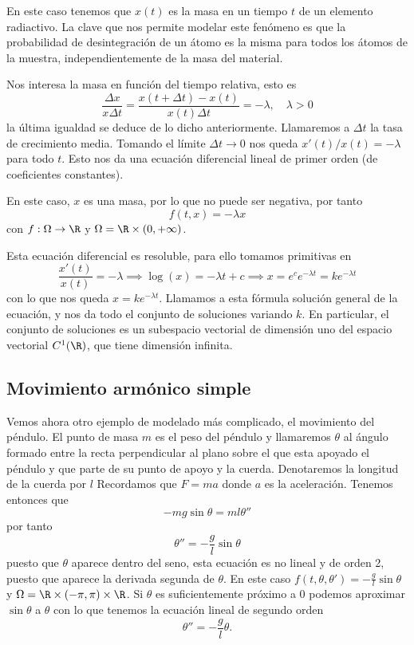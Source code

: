 \documentclass[../main.tex]{subfiles}
\begin{document}
En este caso tenemos que \(x(t)\) es
la masa en un tiempo \(t\) de un elemento radiactivo. La clave que nos permite
modelar este fenómeno es que la probabilidad de desintegración de un átomo es la
misma para todos los átomos de la muestra, independientemente de la masa del
material.

Nos interesa la masa en función del tiempo relativa, esto es
\[\frac{\Delta x}{x \Delta t} = \frac{x(t + \Delta t) - x(t)}{x(t) \Delta t}
	= -\lambda, \quad \lambda > 0\]
la última igualdad se deduce de lo dicho anteriormente. Llamaremos a
\(\Delta t\) la tasa de crecimiento media. Tomando el límite \(\Delta t \to 0\)
nos queda \(x'(t)/x(t) = -\lambda\) para todo \(t\). Esto nos da una ecuación
diferencial lineal de primer orden (de coeficientes constantes).

En este caso, \(x\) es una masa, por lo que no puede ser negativa, por tanto
\[f(t, x) = -\lambda x\]
con \(f : \Omega \to \R\) y \(\Omega = \R \times (0, +\infty)\).

Esta ecuación diferencial es resoluble, para ello tomamos primitivas en
\[\frac{x'(t)}{x(t)} = -\lambda \implies \log(x) = -\lambda t + c
	\implies x = e^c e^{-\lambda t} = k e^{-\lambda t}\]
con lo que nos queda \(x = k e^{-\lambda t}\). Llamamos a esta fórmula solución
general de la ecuación, y nos da todo el conjunto de soluciones variando
\(k\). En particular, el conjunto de soluciones es un subespacio vectorial de
dimensión uno del espacio vectorial \(C^1(\R)\), que tiene dimensión infinita.

\subsection{Movimiento armónico simple}

Vemos ahora otro ejemplo de modelado más complicado, el movimiento del péndulo.
El punto de masa \(m\) es el peso del péndulo y llamaremos \(\theta\) al ángulo
formado entre la recta perpendicular al plano sobre el que esta apoyado el
péndulo y que parte de su punto de apoyo y la cuerda. Denotaremos la longitud
de la cuerda por \(l\) Recordamos que \(F = ma\) donde \(a\) es la aceleración.
Tenemos entonces que
\[-m g \sin\theta = m l \theta''\]
por tanto
\[\theta'' = -\frac{g}{l} \sin\theta\]
puesto que \(\theta\) aparece dentro del seno, esta ecuación es no lineal y de
orden 2, puesto que aparece la derivada segunda de \(\theta\). En este caso
\(f(t, \theta, \theta') = -\frac{g}{l} \sin\theta\) y \(\Omega = \R \times
(-\pi, \pi) \times \R\). Si \(\theta\) es suficientemente próximo a \(0\)
podemos aproximar \(\sin\theta\) a \(\theta\) con lo que tenemos la ecuación
lineal de segundo orden
\[\theta'' = -\frac{g}{l}\theta.\]
\end{document}
